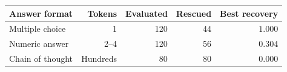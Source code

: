 \begin{tabular}{@{}lrrrr@{}}
\toprule
Answer format & Tokens & Evaluated & Rescued & Best recovery \\
\midrule
Multiple choice & 1 & 120 & 44 & $1.000$ \\
Numeric answer & 2--4 & 120 & 56 & $0.304$ \\
Chain of thought & Hundreds & 80 & 80 & $0.000$ \\
\bottomrule
\end{tabular}
